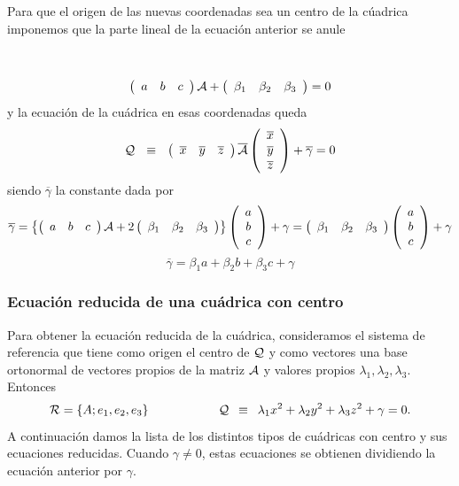 \vspace{.3cm}

Para que el origen de las nuevas coordenadas sea un centro de la c\'uadrica imponemos que la parte lineal de la ecuaci\'on anterior se anule

\

\[
{
\left( \begin{array}{ccc}
a &  b &  c
 \end{array} \right){\cal A}
+
 \left( \begin{array}{ccc}
\beta_1 & \beta_2 & \beta_3
 \end{array} \right)
=0 }
\]
y la ecuaci\'on de la cu\'adrica en esas coordenadas queda
\[
{\cal Q} \, \, \, \, \equiv \, \, \, \,
\left(\begin{array}{ccc}
\overline{x} & \overline{y} & \overline{z}
 \end{array} \right){\overline{\cal A}}
\left(\begin{array}{c}
\overline{x} \\
\overline{y} \\
\overline{z}
\end{array} \right) + \overline{\gamma} = 0
\]
siendo $\overline{\gamma}$ la constante dada por
\[
\overline{\gamma} =
\left\{
\left( \begin{array}{ccc}
a &  b &  c
 \end{array} \right){\cal A}
+
 2\left( \begin{array}{ccc}
\beta_1 & \beta_2 & \beta_3
 \end{array} \right)\right\}
\left( \begin{array}{c}
a \\
b \\
c
 \end{array} \right)
+\gamma =
\left( \begin{array}{ccc}
\beta_1 & \beta_2 & \beta_3
 \end{array} \right)
\left( \begin{array}{c}
a \\
b \\
c
 \end{array} \right)+\gamma
\]
\[
{
\overline{\gamma} =
\beta_1 a+ \beta_2 b+ \beta_3  c
+\gamma
}
\]

\subsubsection{\bf Ecuaci\'on reducida de una cu\'adrica con centro}

Para obtener la ecuaci\'on reducida de la cu\'adrica, consideramos el sistema de referencia que tiene como origen el centro de $\cal Q$ y como vectores una base ortonormal de vectores propios de la matriz $\cal A$ y valores propios $\lambda_1,\lambda_2,\lambda_3$. Entonces
\[
{\cal R} =\{A; {e}_1, {e}_2, {e}_3 \}
\hspace{2cm}
{\cal Q} \, \, \, \equiv \, \, \, \lambda_1 {x}^2 +\lambda_2 {y}^2 +\lambda_3 {z}^2 +
{\gamma} = 0.
\]
A continuaci\'on damos la lista de los distintos tipos de cu\'adricas con centro y  sus ecuaciones reducidas. Cuando ${\gamma}\neq 0$, estas ecuaciones se obtienen dividiendo la ecuaci\'on anterior por ${\gamma}$.

